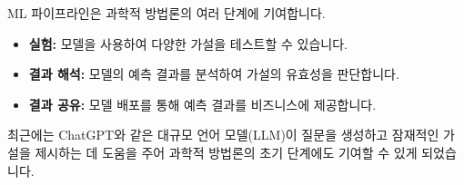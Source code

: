 \documentclass[11pt,a4paper]{article}
\begin{document}
\begin{tcolorbox}[examplebox={과학적 방법론과 ML 파이프라인의 결합}]
ML 파이프라인은 과학적 방법론의 여러 단계에 기여합니다.
\begin{itemize}
    \item \textbf{실험:} 모델을 사용하여 다양한 가설을 테스트할 수 있습니다.
    \item \textbf{결과 해석:} 모델의 예측 결과를 분석하여 가설의 유효성을 판단합니다.
    \item \textbf{결과 공유:} 모델 배포를 통해 예측 결과를 비즈니스에 제공합니다.
\end{itemize}
최근에는 ChatGPT와 같은 대규모 언어 모델(LLM)이 질문을 생성하고 잠재적인 가설을 제시하는 데 도움을 주어 과학적 방법론의 초기 단계에도 기여할 수 있게 되었습니다.
\end{tcolorbox}
\end{document}
